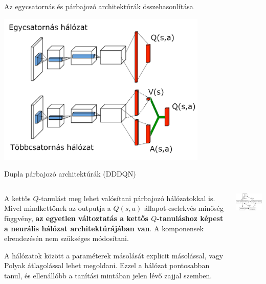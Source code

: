 \documentclass[english, aspectratio=169]{beamer}
\begin{document}
\begin{frame}{Az egycsatornás és párbajozó architektúrák összehasonlítása}
\begin{center}
\includegraphics[width=10cm, keepaspectratio]{images/dql_2.png}
\end{center}
\end{frame}

\begin{frame}{Dupla párbajozó architektúrák (DDDQN)}
\begin{columns}
\begin{column}{.5\textwidth}
A kettős $Q$-tanulást meg lehet valósítani párbajozó hálózatokkal is. Mivel mindkettőnek az outputja a $Q(s,a)$ állapot-cselekvés minőség függvény, \textbf{az egyetlen változtatás a kettős $Q$-tanuláshoz képest a neurális hálózat architektúrájában van}. A komponensek elrendezésén nem szükséges módosítani.\par\smallskip
A hálózatok között a paraméterek másolását explicit másolással, vagy Polyak átlagolással lehet megoldani. Ezzel a hálózat pontosabban tanul, és ellenállóbb a tanítási mintában jelen lévő zajjal szemben.
\end{column}
\begin{column}{.5\textwidth}
\begin{center}
\includegraphics[width=6cm, keepaspectratio]{graphs/dql_6.png}
\end{center}
\end{column}
\end{columns}
\end{frame}
\end{document}

